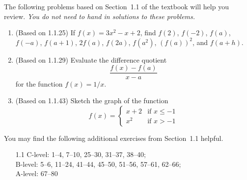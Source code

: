 \documentclass{article}
\title{\commonPSTitleZeroOneOne}
\author{\commonAuthor}
\date{\commonDateZeroOneOne}
\begin{document}
\maketitle
\thispagestyle{empty}

\noindent
The following problems based on Section~1.1 of the textbook will help
you review.  \emph{You do not need to hand in solutions to these
  problems.}
\begin{enumerate}
\item (Based on 1.1.25)
  If $f(x)=3x^2-x+2$, find $f(2)$, $f(-2)$, $f(a)$, $f(-a)$, $f(a+1)$,
  $2f(a)$, $f(2a)$, $f(a^2)$, $(f(a))^2$, and $f(a+h)$.
\item (Based on 1.1.29)
  Evaluate the difference quotient
  \begin{equation*}
    \frac{f(x)-f(a)}{x-a}
  \end{equation*}
  for the function $f(x)=1/x$.
\item (Based on 1.1.43)
  Sketch the graph of the function 
  \begin{equation*}
    f(x) = \begin{cases}
      x+2 &\mbox{if $x\le -1$} \\
      x^2 &\mbox{if $x>-1$}
    \end{cases}
  \end{equation*}
\end{enumerate}

\noindent
You may find the following additional exercises from Section~1.1 helpful.
\begin{itemize}
\item[1.1] 
  C-level: 1--4, 7--10, 25--30, 31--37, 38--40; \\
  B-level: 5--6, 11--24, 41--44, 45--50, 51--56, 57--61, 62--66; \\
  A-level: 67--80 %
\end{itemize}
\end{document}
